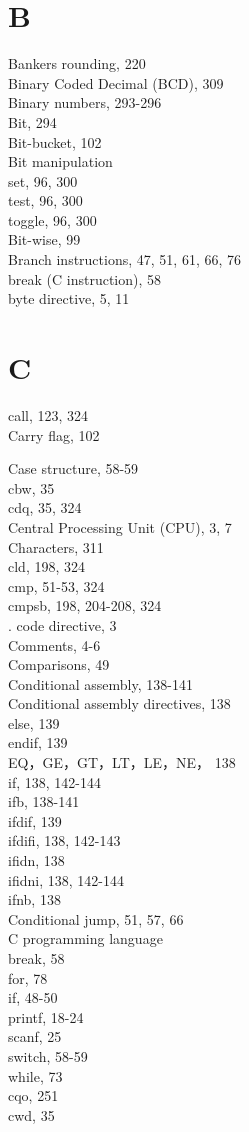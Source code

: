 \documentclass[10pt]{article}
\begin{document}
\section*{B}
Bankers rounding, 220\\
Binary Coded Decimal (BCD), 309\\
Binary numbers, 293-296\\
Bit, 294\\
Bit-bucket, 102\\
Bit manipulation\\
set, 96, 300\\
test, 96, 300\\
toggle, 96, 300\\
Bit-wise, 99\\
Branch instructions, 47, 51, 61, 66, 76\\
break (C instruction), 58\\
byte directive, 5, 11

\section*{C}
call, 123, 324\\
Carry flag, 102

Case structure, 58-59\\
cbw, 35\\
cdq, 35, 324\\
Central Processing Unit (CPU), 3, 7\\
Characters, 311\\
cld, 198, 324\\
cmp, 51-53, 324\\
cmpsb, 198, 204-208, 324\\
. code directive, 3\\
Comments, 4-6\\
Comparisons, 49\\
Conditional assembly, 138-141\\
Conditional assembly directives, 138\\
else, 139\\
endif, 139\\
EQ，GE，GT，LT，LE，NE， 138\\
if, 138, 142-144\\
ifb, 138-141\\
ifdif, 139\\
ifdifi, 138, 142-143\\
ifidn, 138\\
ifidni, 138, 142-144\\
ifnb, 138\\
Conditional jump, 51, 57, 66\\
C programming language\\
break, 58\\
for, 78\\
if, 48-50\\
printf, 18-24\\
scanf, 25\\
switch, 58-59\\
while, 73\\
cqo, 251\\
cwd, 35
\end{document}
